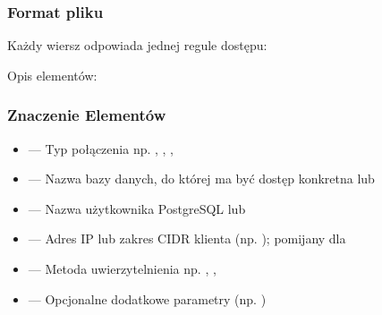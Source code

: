\documentclass[letterpaper,10pt,polish]{sphinxmanual}
\begin{document}
\subsubsection{Format pliku}
\label{\detokenize{rozdzial2/bezpieczenstwo/index:format-pliku}}
\sphinxAtStartPar
Każdy wiersz odpowiada jednej regule dostępu:

\begin{sphinxVerbatim}[commandchars=\\\{\}]
           \PYG{p}{[}\PYG{p}{]}
\end{sphinxVerbatim}

\sphinxAtStartPar
Opis elementów:


\subsubsection{Znaczenie Elementów}
\label{\detokenize{rozdzial2/bezpieczenstwo/index:znaczenie-elementow}}\begin{itemize}
\item {} 
\sphinxAtStartPar
{} — Typ połączenia \textendash{} np. , , , 

\item {} 
\sphinxAtStartPar
{} — Nazwa bazy danych, do której ma być dostęp \textendash{} konkretna lub 

\item {} 
\sphinxAtStartPar
{} — Nazwa użytkownika PostgreSQL lub 

\item {} 
\sphinxAtStartPar
{} — Adres IP lub zakres CIDR klienta (np. ); pomijany dla 

\item {} 
\sphinxAtStartPar
{} — Metoda uwierzytelnienia \textendash{} np. , , 

\item {} 
\sphinxAtStartPar
\sphinxcode{\sphinxupquote{{[}opcje{]}}} — Opcjonalne dodatkowe parametry (np. )

\end{itemize}
\end{document}
